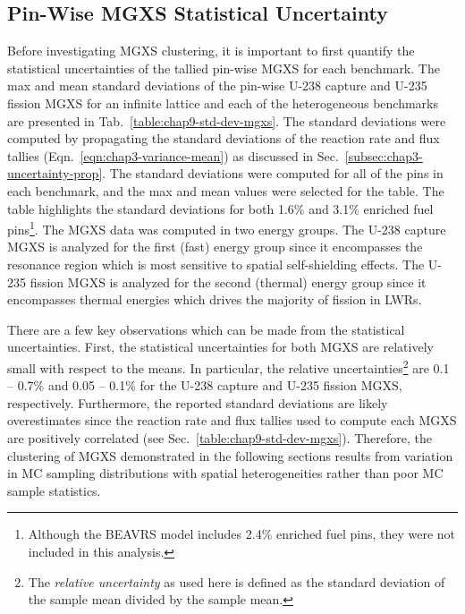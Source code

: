 \subsection{Pin-Wise MGXS Statistical Uncertainty}
\label{subsec:chap9-mgxs-uncertainty}

Before investigating \ac{MGXS} clustering, it is important to first quantify the statistical uncertainties of the tallied pin-wise \ac{MGXS} for each benchmark. The max and mean standard deviations of the pin-wise U-238 capture and U-235 fission \ac{MGXS} for an infinite lattice and each of the heterogeneous benchmarks are presented in Tab.~\ref{table:chap9-std-dev-mgxs}. The standard deviations were computed by propagating the standard deviations of the reaction rate and flux tallies (Eqn.~\ref{eqn:chap3-variance-mean}) as discussed in Sec.~\ref{subsec:chap3-uncertainty-prop}. The standard deviations were computed for all of the pins in each benchmark, and the max and mean values were selected for the table. The table highlights the standard deviations for both 1.6\% and 3.1\% enriched fuel pins\footnote{Although the \ac{BEAVRS} model includes 2.4\% enriched fuel pins, they were not included in this analysis.}. The \ac{MGXS} data was computed in two energy groups. The U-238 capture \ac{MGXS} is analyzed for the first (fast) energy group since it encompasses the resonance region which is most sensitive to spatial self-shielding effects. The U-235 fission \ac{MGXS} is analyzed for the second (thermal) energy group since it encompasses thermal energies which drives the majority of fission in \acp{LWR}.

There are a few key observations which can be made from the statistical uncertainties. First, the statistical uncertainties for both \ac{MGXS} are relatively small with respect to the means. In particular, the relative uncertainties\footnote{The \textit{relative uncertainty} as used here is defined as the standard deviation of the sample mean divided by the sample mean.} are 0.1 -- 0.7\% and 0.05 -- 0.1\% for the U-238 capture and U-235 fission \ac{MGXS}, respectively. Furthermore, the reported standard deviations are likely overestimates since the reaction rate and flux tallies used to compute each \ac{MGXS} are positively correlated (see Sec.~\ref{table:chap9-std-dev-mgxs}). Therefore, the clustering of \ac{MGXS} demonstrated in the following sections results from variation in \ac{MC} sampling distributions with spatial heterogeneities rather than poor \ac{MC} sample statistics.

